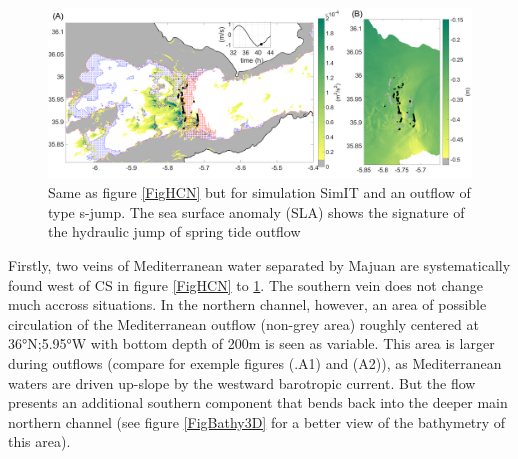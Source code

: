 \begin{figure}[!h]
 \centering
\includegraphics[width=\linewidth]{./GBR3D/IES_41h_p.png}
 \caption [Supercritical flow, location of hydraulic jump, standard deviation of parameter $Q$ in SimIT.]{Same as figure  \ref{FigHCN} but for simulation SimIT and an outflow of type {s-jump}. The sea surface anomaly (SLA) shows the signature of the hydraulic jump of spring tide outflow}
 \label{FigHCI}
\end{figure}

Firstly, two veins of Mediterranean water separated by Majuan are systematically found west of CS in figure \ref{FigHCN} to \ref{FigHCI}.
The southern vein does not change much accross situations. In the northern channel, however, an area of possible circulation of the Mediterranean outflow (non-grey area) roughly centered at 36°N;5.95°W with bottom depth of 200m is seen as variable. This area is larger during outflows (compare for exemple figures (.A1) and (A2)), as Mediterranean waters are driven up-slope by the westward barotropic current. But the flow presents an additional southern component that bends back into the deeper main northern channel (see figure \ref{FigBathy3D} for a better view of the bathymetry of this area).


